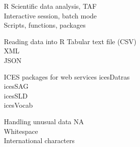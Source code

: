 \documentclass[aspectratio=169]{beamer}
\renewcommand\r[1]{\textblue{#1}}
\begin{document}



\begin{frame}{R}
  Scientific data analysis, TAF\\[4ex]
  Interactive session, batch mode\\[4ex]
  Scripts, functions, packages
\end{frame}


\begin{frame}{Reading data into R}
  Tabular text file (CSV)\\[4ex]
  XML\\[4ex]
  JSON\\[4ex]
\end{frame}


\begin{frame}{ICES packages for web services}
  icesDatras\\[4ex]
  icesSAG\\[4ex]
  icesSLD\\[4ex]
  icesVocab
\end{frame}


\begin{frame}{Handling unusual data}
  NA\\[4ex]
  Whitespace\\[4ex]
  International characters
\end{frame}
\end{document}
